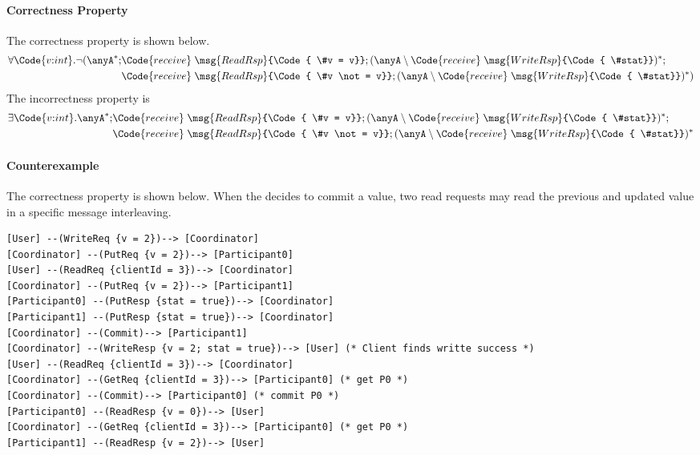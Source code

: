 \paragraph{Correctness Property} The correctness property is shown below.
{\footnotesize\begin{align*}
    \forall \Code{v{:}int}.\neg (\anyA^*;&\Code{receive}\;\msg{ReadRsp}{\Code{ \#v = v}};(\anyA \setminus \Code{receive}\;\msg{WriteRsp}{\Code{ \#stat}})^*; 
    \\&\Code{receive}\;\msg{ReadRsp}{\Code{ \#v \not= v}};(\anyA \setminus \Code{receive}\;\msg{WriteRsp}{\Code{ \#stat}})^*)
\end{align*}}\noindent
The incorrectness property is
{\footnotesize\begin{align*}
    \exists \Code{v{:}int}.\anyA^*;&\Code{receive}\;\msg{ReadRsp}{\Code{ \#v = v}};(\anyA \setminus \Code{receive}\;\msg{WriteRsp}{\Code{ \#stat}})^*; 
    \\&\Code{receive}\;\msg{ReadRsp}{\Code{ \#v \not= v}};(\anyA \setminus \Code{receive}\;\msg{WriteRsp}{\Code{ \#stat}})^*
\end{align*}}\noindent


\paragraph{Counterexample} The correctness property is shown below. When the  decides to commit a value, two read requests may read the previous and updated value in a specific message interleaving.
\begin{verbatim}
[User] --(WriteReq {v = 2})--> [Coordinator]
[Coordinator] --(PutReq {v = 2})--> [Participant0]
[User] --(ReadReq {clientId = 3})--> [Coordinator]
[Coordinator] --(PutReq {v = 2})--> [Participant1]
[Participant0] --(PutResp {stat = true})--> [Coordinator]
[Participant1] --(PutResp {stat = true})--> [Coordinator]
[Coordinator] --(Commit)--> [Participant1]
[Coordinator] --(WriteResp {v = 2; stat = true})--> [User] (* Client finds writte success *)
[User] --(ReadReq {clientId = 3})--> [Coordinator]
[Coordinator] --(GetReq {clientId = 3})--> [Participant0] (* get P0 *)
[Coordinator] --(Commit)--> [Participant0] (* commit P0 *)
[Participant0] --(ReadResp {v = 0})--> [User]
[Coordinator] --(GetReq {clientId = 3})--> [Participant0] (* get P0 *)
[Participant1] --(ReadResp {v = 2})--> [User]
\end{verbatim}

